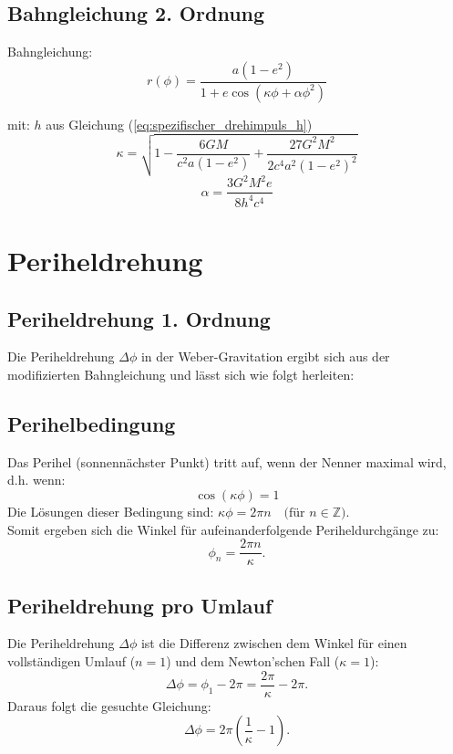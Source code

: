 \subsection{Bahngleichung 2. Ordnung}
Bahngleichung:
\begin{equation}
\label{eq:bahngleichung_2_ordnung}
    \boxed
    {
        r(\phi) = \frac{a(1-e^2)}{1 + e\cos\left(\kappa\phi + \alpha\phi^2\right)}
    }
\end{equation}

mit:
$h$ aus Gleichung (\ref{eq:spezifischer_drehimpuls_h})
\begin{equation}
\label{eq:kappa_2_ordnung}
\boxed
{
    \kappa = \sqrt{1 - \frac{6GM}{c^2a(1-e^2)} + \frac{27G^2M^2}{2c^4a^2(1-e^2)^2}}
}
\end{equation}
\begin{equation}
\label{eq:alpha}
\boxed
{
    \alpha = \frac{3G^2M^2e}{8h^4c^4}    
}
\end{equation}

\section{Periheldrehung}
\subsection{Periheldrehung 1. Ordnung}
Die Periheldrehung $\Delta\phi$ in der Weber-Gravitation ergibt sich aus der modifizierten Bahngleichung und lässt sich wie folgt herleiten:

\subsection*{Perihelbedingung}
Das Perihel (sonnennächster Punkt) tritt auf, wenn der Nenner maximal wird, d.h. wenn:\\
\[\cos(\kappa\phi) = 1\]
Die Lösungen dieser Bedingung sind: $\kappa\phi = 2\pi n \quad \text{(für $n \in \mathbb{Z}$)}$.\\

Somit ergeben sich die Winkel für aufeinanderfolgende Periheldurchgänge zu:
\[
    \phi_n = \frac{2\pi n}{\kappa}.
\]

\subsection*{Periheldrehung pro Umlauf}
Die Periheldrehung $\Delta\phi$ ist die Differenz zwischen dem Winkel für einen vollständigen Umlauf ($n = 1$) und dem Newton'schen Fall ($\kappa = 1$):
\[
    \Delta\phi = \phi_1 - 2\pi = \frac{2\pi}{\kappa} - 2\pi.
\]
Daraus folgt die gesuchte Gleichung:
\begin{equation}
\boxed
{
    \Delta\phi = 2\pi\left(\frac{1}{\kappa} - 1\right)
}.
\end{equation}

